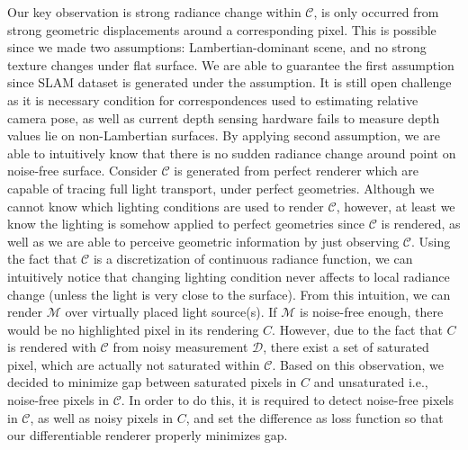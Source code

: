 Our key observation is strong radiance change within $\mathcal{C}$, 
is only occurred from strong geometric displacements around a corresponding pixel. 
This is possible since we made two assumptions: Lambertian-dominant scene, and no strong texture changes under flat surface. 
We are able to guarantee the first assumption since SLAM dataset is generated under the assumption.
It is still open challenge as it is necessary condition for correspondences used to estimating relative camera pose, 
as well as current depth sensing hardware fails to measure depth values lie on non-Lambertian surfaces. 
By applying second assumption, we are able to intuitively know that 
there is no sudden radiance change around point on noise-free surface. 
Consider $\mathcal{C}$ is generated from perfect renderer 
which are capable of tracing full light transport, under perfect geometries. 
Although we cannot know which lighting conditions are used to render $\mathcal{C}$, 
however, at least we know the lighting is somehow applied to 
perfect geometries since $\mathcal{C}$ is rendered, as well as we are able to perceive geometric information by just observing $\mathcal{C}$. 
Using the fact that $\mathcal{C}$ is a discretization of continuous radiance function, 
we can intuitively notice that changing lighting condition 
never affects to local radiance change (unless the light is very close to the surface).
From this intuition, we can render $\mathcal{M}$ over virtually placed light source(s). 
If $\mathcal{M}$ is noise-free enough, there would be no highlighted pixel in its rendering $C$. 
However, due to the fact that $C$ is rendered with $\mathcal{C}$ from noisy measurement $\mathcal{D}$, 
there exist a set of saturated pixel, which are actually not saturated within $\mathcal{C}$. 
Based on this observation, we decided to minimize gap between saturated pixels in $C$ and unsaturated i.e., noise-free pixels in $\mathcal{C}$. 
In order to do this, it is required to detect noise-free pixels in $\mathcal{C}$, as well as noisy pixels in $C$, 
and set the difference as loss function so that our differentiable renderer properly minimizes gap.

